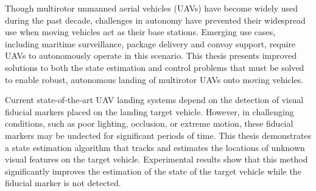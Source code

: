 \afterpage{\cleardoublepage}
Though multirotor unmanned aerial vehicles (UAVs) have become widely used 
during the past decade, challenges in autonomy have prevented their
widespread use when moving vehicles act as their base stations.
Emerging use cases, including maritime
surveillance, package delivery and convoy support, require UAVs to autonomously
operate in this scenario.
This thesis presents improved solutions to both the state estimation and
control problems that must be solved
to enable robust, autonomous landing of multirotor UAVs onto moving vehicles.

Current state-of-the-art UAV landing systems depend on the detection of visual
fiducial markers placed on the landing target vehicle. However, in challenging
conditions, such as poor lighting, occlusion, or extreme motion,
these fiducial markers may be undected for significant
periods of time.
This thesis demonstrates a state estimation algorithm that tracks and estimates
the locations of unknown visual features on the target vehicle.
Experimental results show that this method significantly improves the estimation of the
state of the target vehicle while the fiducial marker is not detected.

